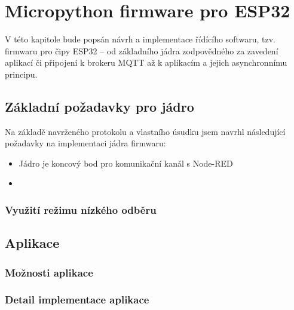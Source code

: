 \chapter{Micropython firmware pro ESP32}
\label{ch:firmware}

V této kapitole bude popsán návrh a implementace řídícího softwaru, tzv. firmwaru pro čipy ESP32 -- od základního
jádra zodpovědného za zavedení aplikací či připojení k brokeru MQTT až k aplikacím a jejich asynchronnímu principu.

\section{Základní požadavky pro jádro}\label{sec:základní-požadavky-pro-jádro}
Na základě navrženého protokolu a vlastního úsudku jsem navrhl následující požadavky na implementaci jádra firmwaru:

\begin{itemize}
    \item Jádro je koncový bod pro komunikační kanál s Node-RED\\
    \item
\end{itemize}



\subsection{Využití režimu nízkého odběru}

\section{Aplikace}

\subsection{Možnosti aplikace}

\subsection{Detail implementace aplikace}

